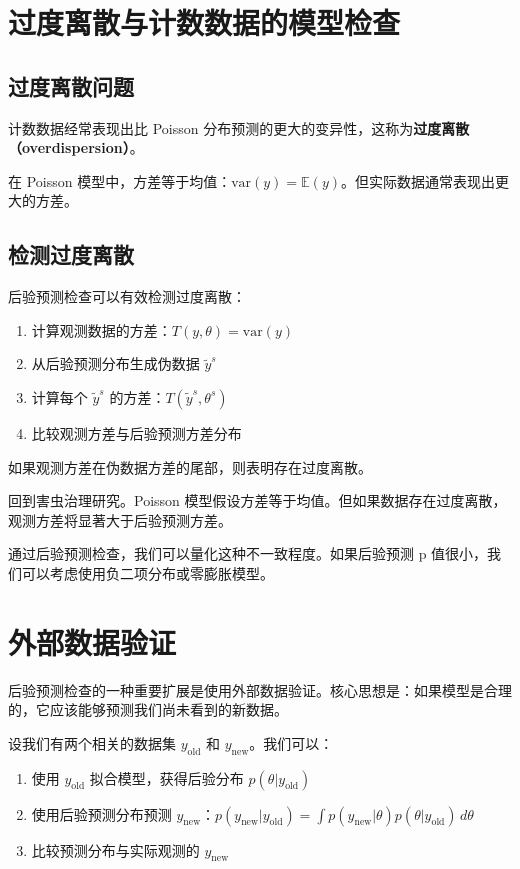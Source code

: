 \section{过度离散与计数数据的模型检查}

\subsection{过度离散问题}

计数数据经常表现出比 Poisson 分布预测的更大的变异性，这称为\textbf{过度离散（overdispersion）}。

在 Poisson 模型中，方差等于均值：$\text{var}(y) = \mathbb{E}(y)$。但实际数据通常表现出更大的方差。

\subsection{检测过度离散}

后验预测检查可以有效检测过度离散：

\begin{enumerate}
  \item 计算观测数据的方差：$T(y, \theta) = \text{var}(y)$
  \item 从后验预测分布生成伪数据 $\tilde{y}^s$
  \item 计算每个 $\tilde{y}^s$ 的方差：$T(\tilde{y}^s, \theta^s)$
  \item 比较观测方差与后验预测方差分布
\end{enumerate}

如果观测方差在伪数据方差的尾部，则表明存在过度离散。

\begin{Example}[害虫数据的过度离散检查]
  回到害虫治理研究。Poisson 模型假设方差等于均值。但如果数据存在过度离散，观测方差将显著大于后验预测方差。

  通过后验预测检查，我们可以量化这种不一致程度。如果后验预测 p 值很小，我们可以考虑使用负二项分布或零膨胀模型。
\end{Example}

\section{外部数据验证}

后验预测检查的一种重要扩展是使用外部数据验证。核心思想是：如果模型是合理的，它应该能够预测我们尚未看到的新数据。

设我们有两个相关的数据集 $y_{\text{old}}$ 和 $y_{\text{new}}$。我们可以：

\begin{enumerate}
  \item 使用 $y_{\text{old}}$ 拟合模型，获得后验分布 $p(\theta | y_{\text{old}})$
  \item 使用后验预测分布预测 $y_{\text{new}}$：$p(y_{\text{new}} | y_{\text{old}}) = \int p(y_{\text{new}} | \theta) p(\theta | y_{\text{old}}) \, d\theta$
  \item 比较预测分布与实际观测的 $y_{\text{new}}$
\end{enumerate}


